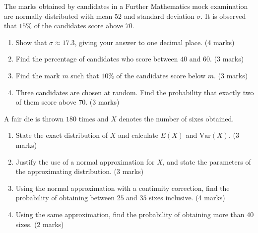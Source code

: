 \documentclass[11pt]{article}
\begin{document}
\begin{exercice}
The marks obtained by candidates in a Further Mathematics mock examination are normally distributed with mean $52$ and standard deviation $\sigma$. It is observed that $15\%$ of the candidates score above $70$.
\begin{enumerate}
\item Show that $\sigma \approx 17.3$, giving your answer to one decimal place. \hfill (4 marks)
\item Find the percentage of candidates who score between $40$ and $60$. \hfill (3 marks)
\item Find the mark $m$ such that $10\%$ of the candidates score below $m$. \hfill (3 marks)
\item Three candidates are chosen at random. Find the probability that exactly two of them score above $70$. \hfill (3 marks)
\end{enumerate}
\end{exercice}

\begin{exercice}
A fair die is thrown $180$ times and $X$ denotes the number of sixes obtained.
\begin{enumerate}
\item State the exact distribution of $X$ and calculate $E(X)$ and $\mathrm{Var}(X)$. \hfill (3 marks)
\item Justify the use of a normal approximation for $X$, and state the parameters of the approximating distribution. \hfill (3 marks)
\item Using the normal approximation with a continuity correction, find the probability of obtaining between $25$ and $35$ sixes inclusive. \hfill (4 marks)
\item Using the same approximation, find the probability of obtaining more than $40$ sixes. \hfill (2 marks)
\end{enumerate}
\end{exercice}
\end{document}
